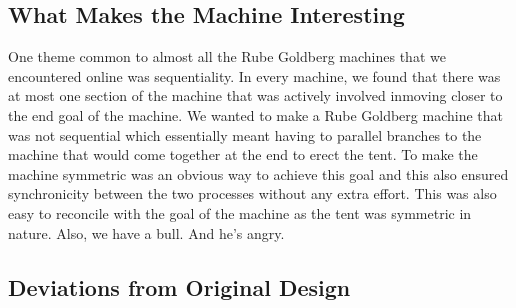 \documentclass[11pt] {article}
\begin{document}
\subsection {What Makes the Machine Interesting}

One theme common to almost all the Rube Goldberg machines that we encountered online was sequentiality. In every 
machine, we found that there was at most one section of the machine that was actively involved inmoving closer 
to the end goal of the machine. We wanted to make a Rube Goldberg machine that was not sequential which 
essentially meant having to parallel branches to the machine that would come together at the end to erect the
tent. To make the machine symmetric was an obvious way to achieve this goal and this also ensured synchronicity 
between the two processes without any extra effort. This was also easy to reconcile with the goal of the machine
as the tent was symmetric in nature. Also, we have a bull. And he's angry.

\subsection {Deviations from Original Design}
\end{document}
